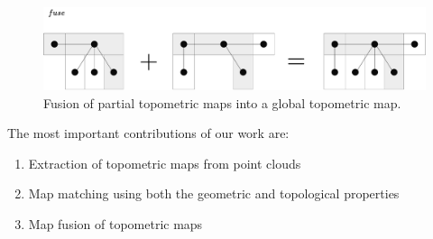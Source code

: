\begin{figure}[h]
    \centering
    \includegraphics*[width=\textwidth]{./fig/overview_diagrams-Page-1.drawio.pdf}
    \caption{Fusion of partial topometric maps into a global topometric map.}
    \label{fig:overview_diagram}
\end{figure}

The most important contributions of our work are:

\begin{enumerate}
    \item Extraction of topometric maps from point clouds
    \item Map matching using both the geometric and topological properties
    \item Map fusion of topometric maps
\end{enumerate}
